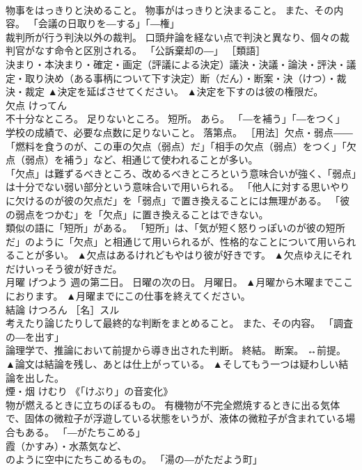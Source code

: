 \documentclass[8pt]{extreport}
\begin{document}
\begin{CJK}{UTF8}{min}
\\	物事をはっきりと決めること。 物事がはっきりと決まること。 また、その内容。 「会議の日取りを―する」「―権」 
\\	裁判所が行う判決以外の裁判。 口頭弁論を経ない点で判決と異なり、個々の裁判官がなす命令と区別される。 「公訴棄却の―」 ［類語］
\\	決まり・本決まり・確定・画定（評議による決定）議決・決議・論決・評決・議定・取り決め（ある事柄について下す決定）断（だん）・断案・決（けつ）・裁決・裁定	▲決定を延ばさせてください。 ▲決定を下すのは彼の権限だ。
\\	欠点	けってん	
\\	不十分なところ。 足りないところ。 短所。 あら。 「―を補う」「―をつく」 
\\	学校の成績で、必要な点数に足りないこと。 落第点。 ［用法］欠点・弱点――「燃料を食うのが、この車の欠点（弱点）だ」「相手の欠点（弱点）をつく」「欠点（弱点）を補う」など、相通じて使われることが多い。 
\\	「欠点」は難ずるべきところ、改めるべきところという意味合いが強く、「弱点」は十分でない弱い部分という意味合いで用いられる。 「他人に対する思いやりに欠けるのが彼の欠点だ」を「弱点」で置き換えることには無理がある。 「彼の弱点をつかむ」を「欠点」に置き換えることはできない。 
\\	類似の語に「短所」がある。 「短所」は、「気が短く怒りっぽいのが彼の短所だ」のように「欠点」と相通じて用いられるが、性格的なことについて用いられることが多い。	▲欠点はあるけれどもやはり彼が好きです。 ▲欠点ゆえにそれだけいっそう彼が好きだ。
\\	月曜	げつよう	週の第二日。 日曜の次の日。 月曜日。	▲月曜から木曜までここにおります。 ▲月曜までにこの仕事を終えてください。
\\	結論	けつろん	［名］スル 
\\	考えたり論じたりして最終的な判断をまとめること。 また、その内容。 「調査の―を出す」 
\\	論理学で、推論において前提から導き出された判断。 終結。 断案。 ↔前提。	▲論文は結論を残し、あとは仕上がっている。 ▲そしてもう一つは疑わしい結論を出した。
\\	煙・烟	けむり	《「けぶり」の音変化》 
\\	物が燃えるときに立ちのぼるもの。 有機物が不完全燃焼するときに出る気体で、固体の微粒子が浮遊している状態をいうが、液体の微粒子が含まれている場合もある。 「―がたちこめる」 
\\	霞（かすみ）・水蒸気など、 
\\	のように空中にたちこめるもの。 「湯の―がただよう町」 

\end{CJK}
\end{document}

